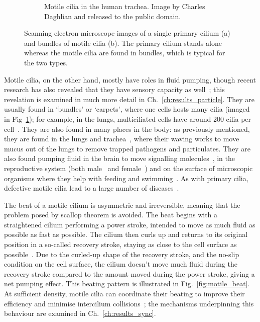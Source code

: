 \begin{figure}
\begin{subfigure}[t]{0.47\linewidth}
        \caption{Motile cilia in the human trachea. Image by Charles Daghlian and released to the public domain.}%
        \label{fig:sem_motile}%
    \end{subfigure}%
    \caption{Scanning electron microscope images of a single primary cilium (a) and bundles of motile cilia (b). The primary cilium stands alone whereas the motile cilia are found in bundles, which is typical for the two types.}%
    \label{fig:sem_photos}%
\end{figure}

Motile cilia, on the other hand, mostly have roles in fluid pumping, though recent research has also revealed that they have sensory capacity as well~; this revelation is examined in much more detail in Ch.~\ref{ch:results_particle}. They are usually found in `bundles' or `carpets', where one cells hosts many cilia (imaged in Fig~\ref{fig:sem_motile}); for example, in the lungs, multiciliated cells have around 200 cilia per cell~. They are also found in many places in the body: as previously mentioned, they are found in the lungs and trachea~, where their waving works to move mucus out of the lungs to remove trapped pathogens and particulates. They are also found pumping fluid in the brain to move signalling molecules~, in the reproductive system (both male~ and female~) and on the surface of microscopic organisms where they help with feeding and swimming~. As with primary cilia, defective motile cilia lead to a large number of diseases~.

The beat of a motile cilium is asymmetric and irreversible, meaning that the problem posed by scallop theorem is avoided. The beat begins with a straightened cilium performing a power stroke, intended to move as much fluid as possible as fast as possible. The cilium then curls up and returns to its original position in a so-called recovery stroke, staying as close to the cell surface as possible~. Due to the curled-up shape of the recovery stroke, and the no-slip condition on the cell surface, the cilium doesn't move much fluid during the recovery stroke compared to the amount moved during the power stroke, giving a net pumping effect. This beating pattern is illustrated in Fig.~\ref{fig:motile_beat}. At sufficient density, motile cilia can coordinate their beating to improve their efficiency and minimise intercilium collisions~; the mechanisms underpinning this behaviour are examined in Ch.~\ref{ch:results_sync}.

